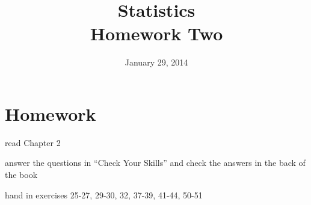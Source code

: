 \documentclass{exam}
\author{}
\date{January 29, 2014}
\title{Statistics \\ Homework Two}
\begin{document}
  \maketitle

  \section{Homework}

  \ifprintanswers
  \else
    \begin{itemize*}
      \item read Chapter 2 
      \item answer the questions in ``Check Your Skills'' and check the answers
        in the back of the book
      \item hand in exercises 25-27, 29-30, 32, 37-39, 41-44, 50-51
    \end{itemize*}
  \fi
\end{document}
